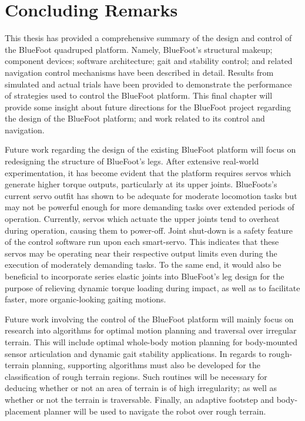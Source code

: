 \chapter{Concluding Remarks}
	\label{ch::conclusion}


	This thesis has provided a comprehensive summary of the design and control of the BlueFoot quadruped platform. Namely, BlueFoot's structural makeup; component devices; software architecture; gait and stability control; and related navigation control mechanisms have been described in detail. Results from simulated and actual trials have been provided to demonstrate the performance of strategies used to control the BlueFoot platform. This final chapter will provide some insight about future directions for the BlueFoot project regarding the design of the BlueFoot platform; and work related to its control and navigation.


	Future work regarding the design of the existing BlueFoot platform will focus on redesigning the structure of BlueFoot's legs. After extensive real-world experimentation, it has become evident that the platform requires servos which generate higher torque outputs, particularly at its upper joints. BlueFoots's current servo outfit has shown to be adequate for moderate locomotion tasks but may not be powerful enough for more demanding tasks over extended periods of operation. Currently, servos which actuate the upper joints tend to overheat during operation, causing them to power-off. Joint shut-down is a safety feature of the control software run upon each smart-servo. This indicates that these servos may be operating near their respective output limits even during the execution of moderately demanding tasks. To the same end, it would also be beneficial to incorporate series elastic joints into  BlueFoot's leg design for the purpose of relieving dynamic torque loading during impact, as well as to facilitate faster, more organic-looking gaiting motions.


	Future work involving the control of the BlueFoot platform will mainly focus on research into algorithms for optimal motion planning and traversal over irregular terrain. This will include optimal whole-body motion planning for body-mounted sensor articulation and dynamic gait stability applications. In regards to rough-terrain planning, supporting algorithms must also be developed for the classification of rough terrain regions. Such routines will be necessary for deducing whether or not an area of terrain is of high irregularity; as well as whether or not the terrain is traversable. Finally, an adaptive footstep and body-placement planner will be used to navigate the robot over rough terrain. 


